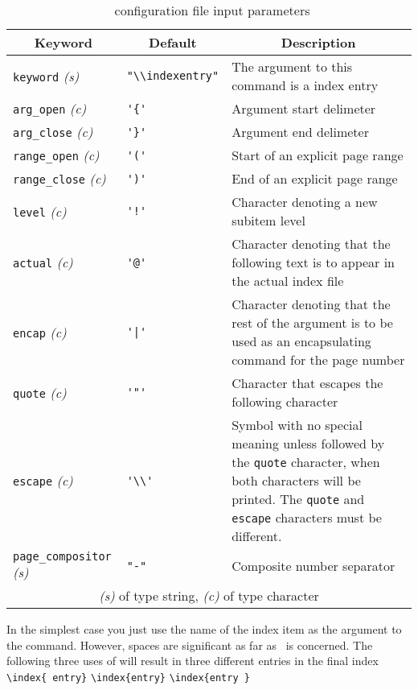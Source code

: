 {\newcommand*{\kwd}[1]{\texttt{#1}}
\newcommand*{\kty}[1]{\textit{(#1)}}

\begin{table}
\centering
\caption{\Pmakeindex\ configuration file input parameters} \label{tab:configin}
\begin{tabular}{llp{}}\toprule
\multicolumn{1}{c}{Keyword} & \multicolumn{1}{c}{Default} & \multicolumn{1}{c}{Description} \\ \midrule
\kwd{keyword} \kty{s} & \verb?"\\indexentry"? & 
  The argument to this command is a \Pmakeindex{} index entry \\
\kwd{arg\_open} \kty{c} & \verb?'{'? &
  Argument start delimeter \\
\kwd{arg\_close} \kty{c} & \verb?'}'? &
  Argument end delimeter \\
\kwd{range\_open} \kty{c} & \verb?'('? &
  Start of an explicit page range \\
\kwd{range\_close} \kty{c} & \verb?')'? &
  End of an explicit page range \\
\kwd{level} \kty{c} & \verb?'!'? &
  Character denoting a new subitem level \\
\kwd{actual} \kty{c} & \verb?'@'? &
  Character denoting that the following text is to appear in the
  actual index file \\
\kwd{encap} \kty{c} & \verb?'|'? &
  Character denoting that the rest of the argument is to be used as
  an encapsulating command for the page number \\
\kwd{quote} \kty{c} & \verb?'"'? &
  Character that escapes the following character \\
\kwd{escape} \kty{c} & \verb?'\\'? &
  Symbol with no special meaning unless followed by the \kwd{quote}
  character, when both characters will be printed. The \kwd{quote}
  and \kwd{escape} characters must be different. \\
\kwd{page\_compositor} \kty{s} & \verb?"-"? &
  Composite number separator \\
\bottomrule
\multicolumn{3}{c}{\kty{s} of type string, \kty{c} of type character} 
\end{tabular}
\end{table}

    In the simplest case you just use the name of the index item as the 
argument to the \cmd{\index} command. However, spaces are significant as far
as \Lmakeindex\ is concerned. The following three uses of \cmd{\index}
will result in three different entries in the final index \\
\verb*?\index{ entry}? \verb*?\index{entry}? \verb*?\index{entry }?

}
